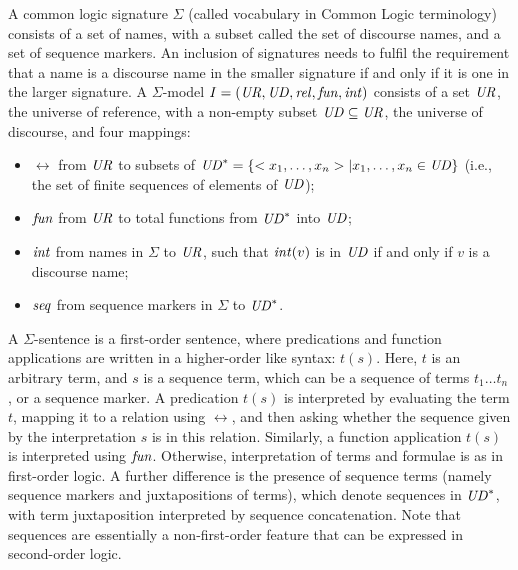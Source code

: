 \documentclass[10pt,%
\ifpretendfinal
final%
\else
draft%
\fi,
]{scrreprt}
\begin{document}
\begin{definition}\label{CommonLogic}   
A common logic signature
$\Sigma$ (called vocabulary in Common Logic terminology) consists of a
set of names, with a subset called the set of discourse names, and a
set of sequence markers. An inclusion of signatures needs to fulfil the
requirement that a name is a discourse
name in the smaller signature if and only if it is one in the larger signature.  A $\Sigma$-model $I=(\mathit{UR},\mathit{UD},\mathit{rel},\mathit{fun},\mathit{int})$ consists of a set $\mathit{UR}$,
the universe of reference, with a non-empty subset $\mathit{UD}\subseteq \mathit{UR}$,
the universe of discourse, and four mappings:
  \begin{itemize}
   \item $\rel$ from $\mathit{UR}$ to subsets of $\mathit{UD}^* = \{<x_1,\ldots,x_n> |
x_1,\ldots,x_n \in \mathit{UD}\}$ (i.e., the set of finite sequences of
elements of $\mathit{UD}$);
   \item $\mathit{fun}$ from $\mathit{UR}$ to total functions from $\mathit{UD}^*$ into $\mathit{UD}$;
   \item $\mathit{int}$ from names in $\Sigma$ to $\mathit{UR}$, such that
$\mathit{int}(v)$ is in $\mathit{UD}$ if and only if $v$ is a discourse name;
   \item $\mathit{seq}$ from sequence markers in $\Sigma$ to $\mathit{UD}^*$.
  \end{itemize}  A $\Sigma$-sentence is a first-order
sentence, where predications and function applications are written
in a higher-order like syntax: $t(s)$.
Here, $t$ is an arbitrary term, and $s$ is a sequence term, which can
be a sequence of terms $t_1\ldots t_n$, or a sequence marker.
A predication $t(s)$ is interpreted by evaluating the term $t$,
mapping it to a relation using $\rel$, and then asking whether the sequence
given by the interpretation $s$ is in this relation.  
Similarly, a function application $t(s)$ is interpreted using $\mathit{fun}$.
Otherwise, interpretation of terms and formulae is as in
first-order logic. 
A further
difference is the presence of sequence terms (namely sequence markers and
juxtapositions of terms), which denote sequences in $\mathit{UD}^*$, with term
juxtaposition interpreted by sequence concatenation.
Note that sequences are essentially a non-first-order feature that
can be expressed in second-order logic.


\end{definition}
\end{document}
